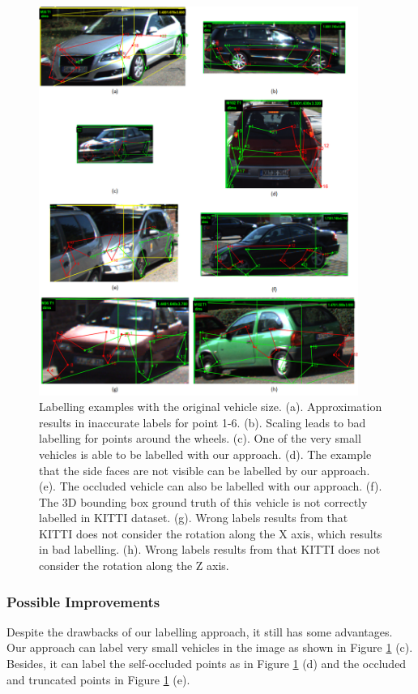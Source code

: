 \documentclass[a4paper,12pt]{article}
\begin{document}
\begin{figure}[H]		
	\includegraphics[width=0.93\textwidth]{label_def.png}
	\caption[Labelling examples of 2D points with the original size.]{Labelling examples with the original vehicle size. (a). Approximation results in inaccurate labels for point 1-6. (b). Scaling leads to bad labelling for points around the wheels. (c). One of the very small vehicles is able to be labelled with our approach. (d). The example that the side faces are not visible can be labelled by our approach. (e). The occluded vehicle can also be labelled with our approach. (f). The 3D bounding box ground truth of this vehicle is not correctly labelled in KITTI dataset. (g). Wrong labels results from that KITTI does not consider the rotation along the X axis, which results in bad labelling. (h). Wrong labels results from that KITTI does not consider the rotation along the Z axis.}
	\centering
	\label{figure:label_def}
\end{figure}

\subsubsection{Possible Improvements}
Despite the drawbacks of our labelling approach, it still has some advantages. Our approach can label very small vehicles in the image as shown in Figure \ref{figure:label_def} (c). Besides, it can label the self-occluded points as in Figure \ref{figure:label_def} (d) and the occluded and truncated points in Figure \ref{figure:label_def} (e). 
\end{document}
